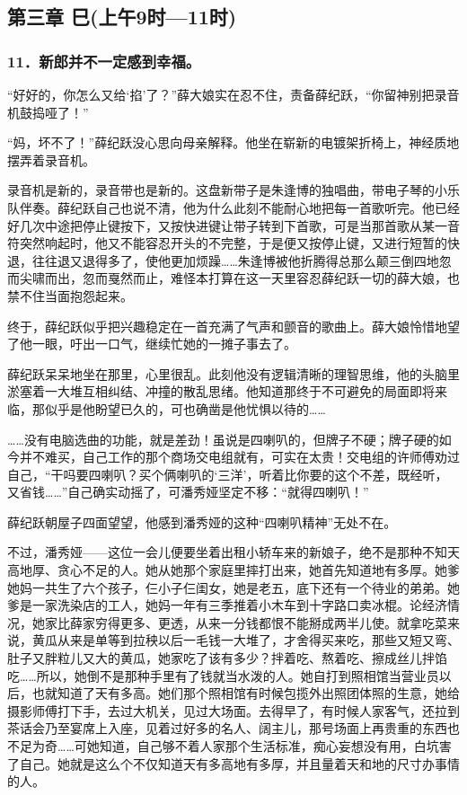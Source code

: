 \subsection*{第三章 巳(上午9时—11时)}

\subsubsection*{11．新郎并不一定感到幸福。}
\par “好好的，你怎么又给‘掐’了？”薛大娘实在忍不住，责备薛纪跃，“你留神别把录音机鼓捣哑了！”
\par “妈，坏不了！”薛纪跃没心思向母亲解释。他坐在崭新的电镀架折椅上，神经质地摆弄着录音机。
\par 录音机是新的，录音带也是新的。这盘新带子是朱逢博的独唱曲，带电子琴的小乐队伴奏。薛纪跃自己也说不清，他为什么此刻不能耐心地把每一首歌听完。他已经好几次中途把停止键按下，又按快进键让带子转到下首歌，可是当那首歌从某一音符突然响起时，他又不能容忍开头的不完整，于是便又按停止键，又进行短暂的快退，往往退又退得多了，使他更加烦躁……朱逢博被他折腾得总那么颠三倒四地忽而尖啸而出，忽而戛然而止，难怪本打算在这一天里容忍薛纪跃一切的薛大娘，也禁不住当面抱怨起来。
\par 终于，薛纪跃似乎把兴趣稳定在一首充满了气声和颤音的歌曲上。薛大娘怜惜地望了他一眼，吁出一口气，继续忙她的一摊子事去了。
\par 薛纪跃呆呆地坐在那里，心里很乱。此刻他没有逻辑清晰的理智思维，他的头脑里淤塞着一大堆互相纠结、冲撞的散乱思绪。他知道那终于不可避免的局面即将来临，那似乎是他盼望已久的，可也确凿是他忧惧以待的……
\par ……没有电脑选曲的功能，就是差劲！虽说是四喇叭的，但牌子不硬；牌子硬的如今并不难买，自己工作的那个商场交电组就有，可实在太贵！交电组的许师傅劝过自己，“干吗要四喇叭？买个俩喇叭的‘三洋’，听着比你要的这个不差，既经听，又省钱……”自己确实动摇了，可潘秀娅坚定不移：“就得四喇叭！”
\par 薛纪跃朝屋子四面望望，他感到潘秀娅的这种“四喇叭精神”无处不在。
\par 不过，潘秀娅——这位一会儿便要坐着出租小轿车来的新娘子，绝不是那种不知天高地厚、贪心不足的人。她从她那个家庭里摔打出来，她首先知道地有多厚。她爹她妈一共生了六个孩子，仨小子仨闺女，她是老五，底下还有一个待业的弟弟。她爹是一家洗染店的工人，她妈一年有三季推着小木车到十字路口卖冰棍。论经济情况，她家比薛家穷得更多、更透，从来一分钱都恨不能掰成两半儿使。就拿吃菜来说，黄瓜从来是单等到拉秧以后一毛钱一大堆了，才舍得买来吃，那些又短又弯、肚子又胖粒儿又大的黄瓜，她家吃了该有多少？拌着吃、熬着吃、擦成丝儿拌馅吃……所以，她倒不是那种手里有了钱就当水泼的人。她自打到照相馆当营业员以后，也就知道了天有多高。她们那个照相馆有时候包揽外出照团体照的生意，她给摄影师傅打下手，去过大机关，见过大场面。去得早了，有时候人家客气，还拉到茶话会乃至宴席上入座，见着过好多的名人、阔主儿，那号场面上再贵重的东西也不足为奇……可她知道，自己够不着人家那个生活标准，痴心妄想没有用，白坑害了自己。她就是这么个不仅知道天有多高地有多厚，并且量着天和地的尺寸办事情的人。
